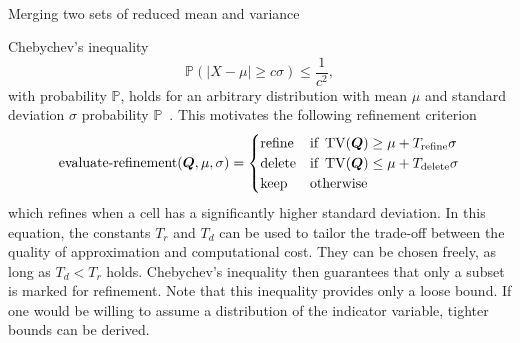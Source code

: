 \begin{algorithm}[ht]
  \begin{algorithmic}
  \State{}
\EndIf\
  \State{}
\EndIf\
  \Let{$m_b$}{$\variance_1 (\gobsCount_1 - 1)$}
  \State\Return{$
    \nicefrac{\mean_\Sigma}{\gobsCount_\Sigma},
    \nicefrac{m_\text{total}}{\gobsCount_\Sigma - 1},
    \gobsCount_\Sigma
    $}
\EndFunction\
  \end{algorithmic}
  \caption{\label{alg:merge-variance}
    Merging two sets of reduced mean and variance~\cite{chan1982updating}}
\end{algorithm}
Chebychev's inequality
\begin{equation}
  \label{eq:chebychev}
  \mathbb{P}(\vert X - \mu \vert \geq c \sigma) \leq \frac{1}{c^2},
\end{equation}
with probability $\mathbb{P}$,
holds for an arbitrary distribution with mean $\mu$ and standard deviation $\sigma$ probability $\mathbb{P}$~\cite{wasserman2004all}.
This motivates the following refinement criterion
\begin{equation}
  \label{eq:refinement-criterion}
  \operatorname{evaluate-refinement}(\bm{Q}, \mu, \sigma) =
  \begin{cases}
    \text{refine} & \text{if } \operatorname{TV}(\bm{Q}) \geq \mu + T_\text{refine} \sigma \\
    \text{delete} & \text{if } \operatorname{TV}(\bm{Q}) \leq \mu + T_\text{delete} \sigma \\
    \text{keep} & \text{otherwise}
    \end{cases}
\end{equation}
which refines when a cell has a significantly higher standard deviation.
In this equation, the constants $T_r$ and $T_d$ can be used to tailor the trade-off between the quality of approximation and computational cost.
They can be chosen freely, as long as $T_d < T_r$ holds.
Chebychev's inequality then guarantees that only a subset is marked for refinement.
Note that this inequality provides only a loose bound.
If one would be willing to assume a distribution of the indicator variable, tighter bounds can be derived.

